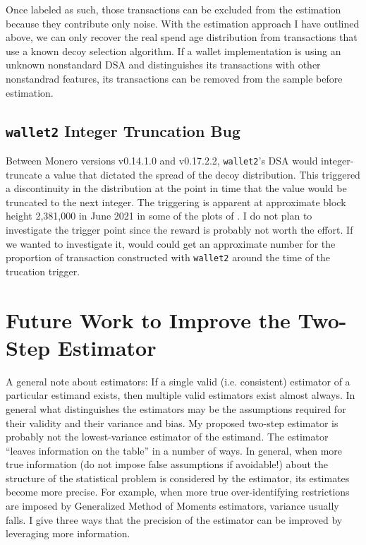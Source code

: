 \documentclass[english]{article}
\begin{document}
Once labeled as such, those transactions can be excluded from the
estimation because they contribute only noise. With the estimation
approach I have outlined above, we can only recover the real spend
age distribution from transactions that use a known decoy selection
algorithm. If a wallet implementation is using an unknown nonstandard
DSA and distinguishes its transactions with other nonstandrad features,
its transactions can be removed from the sample before estimation.

\subsection{\texttt{wallet2} Integer Truncation Bug}

Between Monero versions v0.14.1.0 and v0.17.2.2, \texttt{wallet2}'s
DSA would integer-truncate a value that dictated the spread of the
decoy distribution. This triggered a discontinuity in the distribution
at the point in time that the value would be truncated to the next
integer. The triggering is apparent at approximate block height 2,381,000
in June 2021 in some of the plots of \cite{Krawiec-Thayer2021}. I
do not plan to investigate the trigger point since the reward is probably
not worth the effort. If we wanted to investigate it, would could
get an approximate number for the proportion of transaction constructed
with \texttt{wallet2} around the time of the trucation trigger.

\section{Future Work to Improve the Two-Step Estimator\label{sec:Future-Work-to-Improve-the-Two-Step-Estimator}}

A general note about estimators: If a single valid (i.e. consistent)
estimator of a particular estimand exists, then multiple valid estimators
exist almost always. In general what distinguishes the estimators
may be the assumptions required for their validity and their variance
and bias. My proposed two-step estimator is probably not the lowest-variance
estimator of the estimand. The estimator ``leaves information on
the table'' in a number of ways. In general, when more true information
(do not impose false assumptions if avoidable!) about the structure
of the statistical problem is considered by the estimator, its estimates
become more precise. For example, when more true over-identifying
restrictions are imposed by Generalized Method of Moments estimators,
variance usually falls. I give three ways that the precision of the
estimator can be improved by leveraging more information.
\end{document}
